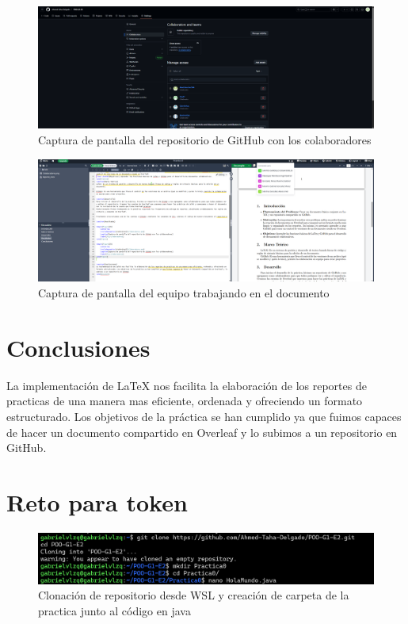 \documentclass[letterpaper,12pt]{article}
\begin{document}
\begin{figure}[H]
    \centering
    \includegraphics[width=14cm]{Colaboradores.png}
    \caption{Captura de pantalla del repositorio de GitHub con los colaboradores}
    \label{fig:colaboradores}
\end{figure}


\begin{figure}[H]
    \centering
    \includegraphics[width=14cm]{Edicion.png}
    \caption{Captura de pantalla del equipo trabajando en el documento}
    \label{fig:colaboradores}
\end{figure}



\section{Conclusiones}
La implementación de LaTeX nos facilita la elaboración de los reportes de practicas de una manera mas eficiente, ordenada y ofreciendo un formato estructurado. Los objetivos de la práctica se han cumplido ya que fuimos capaces de hacer un documento compartido en Overleaf y lo subimos a un repositorio en GitHub.

\section{Reto para token}


\begin{figure}[H]
    \centering
    \includegraphics[width=14cm]{clonacion.png}
    \caption{Clonación de repositorio desde WSL y creación de carpeta de la practica junto al código en java}
    \label{fig:java}
\end{figure}
\end{document}
